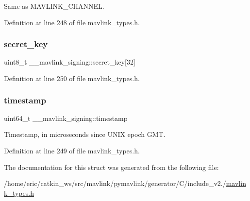 Same as M\+A\+V\+L\+I\+N\+K\+\_\+\+C\+H\+A\+N\+N\+EL. 



Definition at line 248 of file mavlink\+\_\+types.\+h.

\mbox{\label{struct____mavlink__signing_ade31cece3d550b1bf2e41c9c38b9964f}} 
\subsubsection{\texorpdfstring{secret\_key}{secret\_key}}
{\footnotesize\ttfamily uint8\+\_\+t \+\_\+\+\_\+mavlink\+\_\+signing\+::secret\+\_\+key\mbox{[}32\mbox{]}}



Definition at line 250 of file mavlink\+\_\+types.\+h.

\mbox{\label{struct____mavlink__signing_ac6010de27e406777d336935ba93ddac1}} 
\subsubsection{\texorpdfstring{timestamp}{timestamp}}
{\footnotesize\ttfamily uint64\+\_\+t \+\_\+\+\_\+mavlink\+\_\+signing\+::timestamp}



Timestamp, in microseconds since U\+N\+IX epoch G\+MT. 



Definition at line 249 of file mavlink\+\_\+types.\+h.



The documentation for this struct was generated from the following file\+:\begin{DoxyCompactItemize}
\item 
/home/eric/catkin\+\_\+ws/src/mavlink/pymavlink/generator/\+C/include\+\_\+v2./\mbox{\hyperlink{include__v2_80_2mavlink__types_8h}{mavlink\+\_\+types.\+h}}\end{DoxyCompactItemize}
